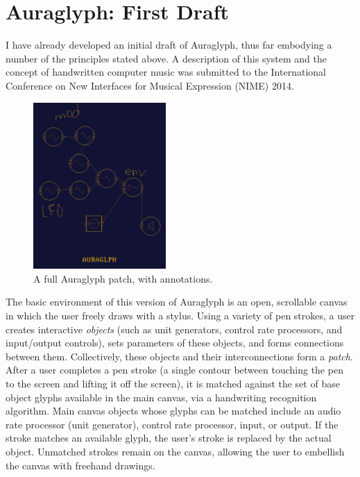 \documentclass[10pt,letterpaper]{article}
\begin{document}

\section{Auraglyph: First Draft}
\label{sec:SystemDescription}

I have already developed an initial draft of Auraglyph, thus far embodying a number of the principles stated above. 
A description of this system and the concept of handwritten computer music was submitted to the International Conference on New Interfaces for Musical Expression (NIME) 2014. 


\begin{figure}[h]
	\centering
		\includegraphics[width=0.45\textwidth]{figures/patch.png}
	\caption{A full Auraglyph patch, with annotations.}
	\label{fig:patch}
\end{figure}

The basic environment of this version of Auraglyph is an open, scrollable canvas in which the user freely draws with a stylus. 
Using a variety of pen strokes, a user creates interactive \emph{objects} (such as unit generators, control rate processors, and input/output controls), sets parameters of these objects, and forms connections between them. 
Collectively, these objects and their interconnections form a \emph{patch}. 
After a user completes a pen stroke (a single contour between touching the pen to the screen and lifting it off the screen), it is matched against the set of base object glyphs available in the main canvas, via a handwriting recognition algorithm. 
Main canvas objects whose glyphs can be matched include an audio rate processor (unit generator), control rate processor, input, or output. 
If the stroke matches an available glyph, the user's stroke is replaced by the actual object. 
Unmatched strokes remain on the canvas, allowing the user to embellish the canvas with freehand drawings. 
\end{document}
